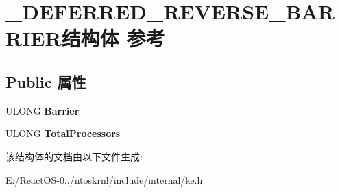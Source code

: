 \hypertarget{struct___d_e_f_e_r_r_e_d___r_e_v_e_r_s_e___b_a_r_r_i_e_r}{}\section{\+\_\+\+D\+E\+F\+E\+R\+R\+E\+D\+\_\+\+R\+E\+V\+E\+R\+S\+E\+\_\+\+B\+A\+R\+R\+I\+E\+R结构体 参考}
\label{struct___d_e_f_e_r_r_e_d___r_e_v_e_r_s_e___b_a_r_r_i_e_r}
\subsection*{Public 属性}
\begin{DoxyCompactItemize}
\item 
\mbox{\label{struct___d_e_f_e_r_r_e_d___r_e_v_e_r_s_e___b_a_r_r_i_e_r_a4770c76333c3898ae87b192652da31a3}} 
U\+L\+O\+NG {\bfseries Barrier}
\item 
\mbox{\label{struct___d_e_f_e_r_r_e_d___r_e_v_e_r_s_e___b_a_r_r_i_e_r_abe4be6abbc6e86bc81f89049ff894df4}} 
U\+L\+O\+NG {\bfseries Total\+Processors}
\end{DoxyCompactItemize}


该结构体的文档由以下文件生成\+:\begin{DoxyCompactItemize}
\item 
E\+:/\+React\+O\+S-\/0../ntoskrnl/include/internal/ke.\+h\end{DoxyCompactItemize}
